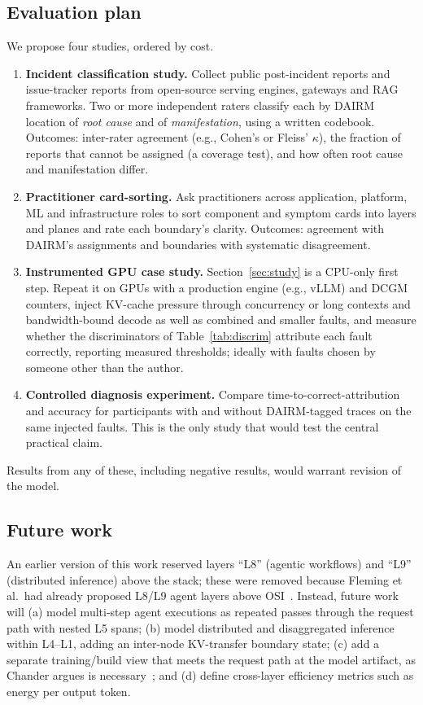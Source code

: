\documentclass[11pt]{article}
\begin{document}
\subsection{Evaluation plan}
\label{sec:eval}
We propose four studies, ordered by cost.
\begin{enumerate}[leftmargin=*,itemsep=2pt]
\item \textbf{Incident classification study.} Collect public post-incident reports and issue-tracker reports from open-source serving engines, gateways and RAG frameworks. Two or more independent raters classify each by DAIRM location of \emph{root cause} and of \emph{manifestation}, using a written codebook. Outcomes: inter-rater agreement (e.g., Cohen's or Fleiss' $\kappa$), the fraction of reports that cannot be assigned (a coverage test), and how often root cause and manifestation differ.
\item \textbf{Practitioner card-sorting.} Ask practitioners across application, platform, ML and infrastructure roles to sort component and symptom cards into layers and planes and rate each boundary's clarity. Outcomes: agreement with DAIRM's assignments and boundaries with systematic disagreement.
\item \textbf{Instrumented GPU case study.} Section~\ref{sec:study} is a CPU-only first step. Repeat it on GPUs with a production engine (e.g., vLLM) and DCGM counters, inject KV-cache pressure through concurrency or long contexts and bandwidth-bound decode as well as combined and smaller faults, and measure whether the discriminators of Table~\ref{tab:discrim} attribute each fault correctly, reporting measured thresholds; ideally with faults chosen by someone other than the author.
\item \textbf{Controlled diagnosis experiment.} Compare time-to-correct-attribution and accuracy for participants with and without DAIRM-tagged traces on the same injected faults. This is the only study that would test the central practical claim.
\end{enumerate}
Results from any of these, including negative results, would warrant revision of the model.

\subsection{Future work}
An earlier version of this work reserved layers ``L8'' (agentic workflows) and ``L9'' (distributed inference) above the stack; these were removed because Fleming et al.\ had already proposed L8/L9 agent layers above OSI~\cite{fleming2025ioa}. Instead, future work will (a) model multi-step agent executions as repeated passes through the request path with nested L5 spans; (b) model distributed and disaggregated inference within L4--L1, adding an inter-node KV-transfer boundary state; (c) add a separate training/build view that meets the request path at the model artifact, as Chander argues is necessary~\cite{chander2026map}; and (d) define cross-layer efficiency metrics such as energy per output token.
\end{document}

